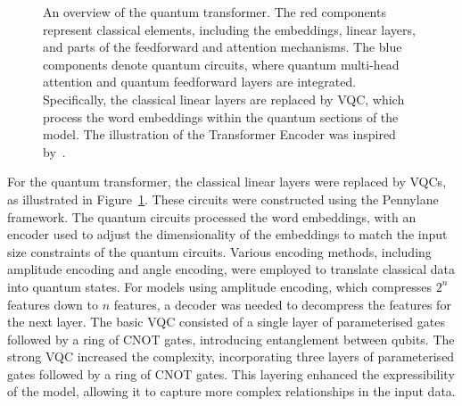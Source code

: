 \begin{figure}[ht]
  \begin{center}
  \end{center}
  \vspace{-0.5cm}
  \caption{An overview of the quantum transformer. The red components
    represent classical elements, including the embeddings, linear
    layers, and parts of the feedforward and attention mechanisms.
    The blue components denote quantum circuits, where quantum
    multi-head attention and quantum feedforward layers are
    integrated. Specifically, the classical linear layers are
    replaced by \gls{VQC}, which process the word embeddings within
    the quantum sections of the model. The
    illustration of the Transformer Encoder was inspired
    by~\citet{disipio2021dawn}.}
  \label{fig:qt_architecture}
\end{figure}

For the quantum transformer, the classical linear layers were
replaced by \glspl{VQC}, as illustrated in
Figure~\ref{fig:qt_architecture}. These circuits were constructed
using the Pennylane framework. The quantum circuits processed the
word embeddings, with an encoder used to adjust the dimensionality of
the embeddings to match the input size constraints of the quantum
circuits. Various encoding methods, including amplitude encoding and
angle encoding, were employed to translate classical data into
quantum states. For models using amplitude encoding, which compresses
\(2^n\) features down to \(n\) features, a decoder was needed to
decompress the features for the next layer. The basic \gls{VQC}
consisted of a single layer of parameterised gates followed by a ring
of \gls{CNOT} gates, introducing entanglement between qubits. The
strong \gls{VQC} increased the complexity, incorporating three layers
of parameterised gates followed by a ring of \gls{CNOT} gates. This
layering enhanced the expressibility of the model, allowing it to
capture more complex relationships in the input data.

